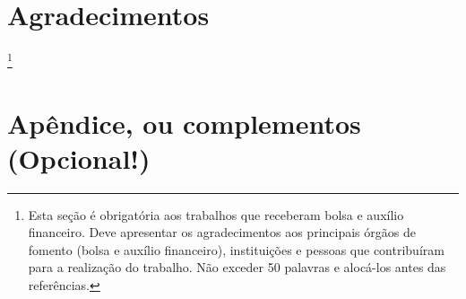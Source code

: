 \documentclass[a4,12pt]{modelo}
\newcommand{\agradecimentosTexto}{Esta seção é obrigatória aos trabalhos que receberam bolsa e auxílio financeiro. Deve apresentar os agradecimentos aos principais órgãos de fomento (bolsa e auxílio financeiro), instituições e pessoas que contribuíram para a realização do trabalho. Não exceder 50 palavras e alocá-los antes das referências.}
\begin{document}
\section*{Agradecimentos}
\thanks{\agradecimentosTexto}  

 


\appendix
\section*{Apêndice, ou complementos (Opcional!)}\label{apendiceA}
\end{document}
